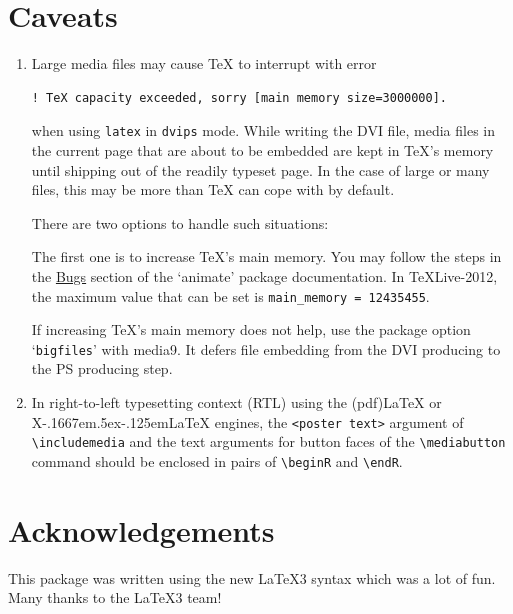 \documentclass[a4paper]{article}
\def\XeLaTeX{X\kern-.1667em\lower.5ex\hbox{\reflectbox{E}}\kern-.125em\LaTeX}
\begin{document}
\section{Caveats}\label{bugs}
\begin{enumerate}
  \item Large media files may cause \TeX{} to interrupt with error
\begin{verbatim}
! TeX capacity exceeded, sorry [main memory size=3000000].
\end{verbatim}
when using \verb+latex+ in \verb+dvips+ mode. While writing the DVI file, media files in the current page that are about to be embedded are kept in \TeX's memory until shipping out of the readily typeset page. In the case of large or many files, this may be more than \TeX{} can cope with by default.

There are two options to handle such situations:

The first one is to increase \TeX's main memory. You may follow the steps in the \href{http://mirror.ctan.org/macros/latex/contrib/animate/animate.pdf\#dest:mem}{Bugs} section of the `animate' package documentation. In \TeX{}Live-2012, the maximum value that can be set is \verb+main_memory = 12435455+.

If increasing \TeX's main memory does not help, use the package option `\verb+bigfiles+' with media9. It defers file embedding from the DVI producing to the PS producing step.

  \item In right-to-left typesetting context (RTL) using the (pdf)\LaTeX{} or \XeLaTeX{} engines, the \verb+<poster text>+ argument of \verb+\includemedia+ and the text arguments for button faces of the \verb+\mediabutton+ command should be enclosed in pairs of \verb+\beginR+ and \verb+\endR+.
\end{enumerate}

\section{Acknowledgements}
This package was written using the new \LaTeX3 syntax which was a lot of fun. Many thanks to the \LaTeX3 team!
\end{document}
